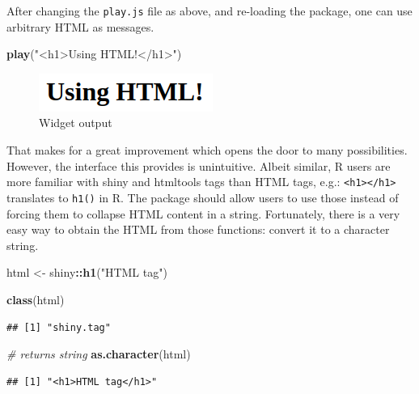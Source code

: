 \documentclass[
]{krantz}
\makeatletter
\newenvironment{Shaded}{\begin{snugshade}}{\end{snugshade}}
\newcommand{\CommentTok}[1]{\textcolor[rgb]{0.37,0.37,0.37}{\textit{#1}}}
\newcommand{\KeywordTok}[1]{\textcolor[rgb]{0.27,0.27,0.27}{\textbf{#1}}}
\newcommand{\NormalTok}[1]{#1}
\newcommand{\OperatorTok}[1]{\textcolor[rgb]{0.43,0.43,0.43}{\textbf{#1}}}
\newcommand{\StringTok}[1]{\textcolor[rgb]{0.5,0.5,0.5}{#1}}
\newenvironment{kframe}{%
\medskip{}
\setlength{\fboxsep}{.8em}
 \def\at@end@of@kframe{}%
 \ifinner\ifhmode%
  \def\at@end@of@kframe{\end{minipage}}%
  \begin{minipage}{\columnwidth}%
 \fi\fi%
 \def\FrameCommand##1{\hskip\@totalleftmargin \hskip-\fboxsep
 \colorbox{shadecolor}{##1}\hskip-\fboxsep
     \hskip-\linewidth \hskip-\@totalleftmargin \hskip\columnwidth}%
 \MakeFramed {\advance\hsize-\width
   \@totalleftmargin\z@ \linewidth\hsize
   \@setminipage}}%
 {\par\unskip\endMakeFramed%
 \at@end@of@kframe}
\renewenvironment{Shaded}{\begin{kframe}}{\end{kframe}}
\makeatother
\begin{document}
After changing the \texttt{play.js} file as above, and re-loading the package, one can use arbitrary HTML as messages.

\begin{Shaded}
\begin{Highlighting}[]
\KeywordTok{play}\NormalTok{(}\StringTok{"<h1>Using HTML!</h1>"}\NormalTok{)}
\end{Highlighting}
\end{Shaded}

\begin{figure}
\centering
\includegraphics{images/playground-h1.png}
\caption{Widget output}
\end{figure}

That makes for a great improvement which opens the door to many possibilities. However, the interface this provides is unintuitive. Albeit similar, R users are more familiar with shiny and htmltools \citep{R-htmltools} tags than HTML tags, e.g.: \texttt{\textless{}h1\textgreater{}\textless{}/h1\textgreater{}} translates to \texttt{h1()} in R. The package should allow users to use those instead of forcing them to collapse HTML content in a string. Fortunately, there is a very easy way to obtain the HTML from those functions: convert it to a character string.

\begin{Shaded}
\begin{Highlighting}[]
\NormalTok{html <{-}}\StringTok{ }\NormalTok{shiny}\OperatorTok{::}\KeywordTok{h1}\NormalTok{(}\StringTok{"HTML tag"}\NormalTok{)}

\KeywordTok{class}\NormalTok{(html)}
\end{Highlighting}
\end{Shaded}

\begin{verbatim}
## [1] "shiny.tag"
\end{verbatim}

\begin{Shaded}
\begin{Highlighting}[]
\CommentTok{\# returns string}
\KeywordTok{as.character}\NormalTok{(html)}
\end{Highlighting}
\end{Shaded}

\begin{verbatim}
## [1] "<h1>HTML tag</h1>"
\end{verbatim}
\end{document}
